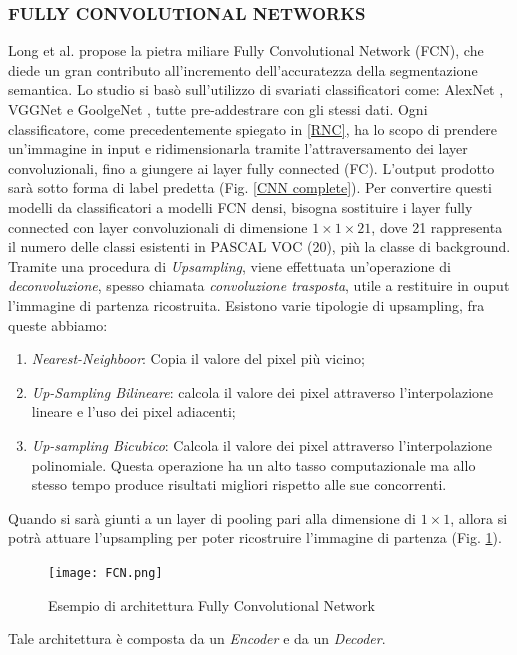 \subsubsection{FULLY CONVOLUTIONAL NETWORKS}
Long et al. \cite{fcn} propose la pietra miliare Fully Convolutional Network (FCN), 
che diede un gran contributo all'incremento dell'accuratezza della segmentazione 
semantica. Lo studio si basò sull'utilizzo di svariati classificatori come: AlexNet \cite{alexnet}, 
VGGNet\cite{vggNet} e GoolgeNet \cite{googleNet}, tutte pre-addestrare con gli stessi dati. 
Ogni classificatore, come precedentemente spiegato in \ref{RNC}, ha lo scopo di prendere 
un'immagine in input e ridimensionarla tramite l'attraversamento dei layer 
convoluzionali, fino a giungere ai layer fully connected (FC). L'output prodotto 
sarà sotto forma di label predetta (Fig. \ref{CNN complete}). Per convertire questi modelli da 
classificatori a modelli FCN densi, bisogna sostituire i layer fully connected con 
layer convoluzionali di dimensione $1 \times 1 \times 21$, dove 21 rappresenta il numero delle 
classi esistenti in PASCAL VOC (20), più la classe di background. Tramite una 
procedura di \emph{Upsampling}, viene effettuata un'operazione di \emph{deconvoluzione}, spesso 
chiamata \emph{convoluzione trasposta}, utile a restituire in ouput l'immagine di partenza 
ricostruita. Esistono varie tipologie di upsampling, fra queste abbiamo:
\begin{enumerate}
    \item \emph{Nearest-Neighboor}: Copia il valore del pixel più vicino;
    \item \emph{Up-Sampling Bilineare}: calcola il valore dei pixel attraverso l'interpolazione lineare e l'uso dei pixel adiacenti;
    \item \emph{Up-sampling Bicubico}: Calcola il valore dei pixel attraverso l'interpolazione polinomiale. Questa operazione ha un alto tasso computazionale ma allo stesso tempo produce risultati migliori rispetto alle sue concorrenti. 
\end{enumerate}
Quando si sarà giunti a un layer di pooling pari alla dimensione di $1 \times 1$, allora 
si potrà attuare l'upsampling per poter ricostruire l'immagine di partenza (Fig. \ref{FCN}). 
\begin{figure}
    \centering
    \texttt{[image: FCN.png]}
    \centering
    \caption{Esempio di architettura Fully Convolutional Network}
    \label{FCN}
\end{figure}
Tale architettura è composta da un \emph{Encoder} e da un \emph{Decoder}.
